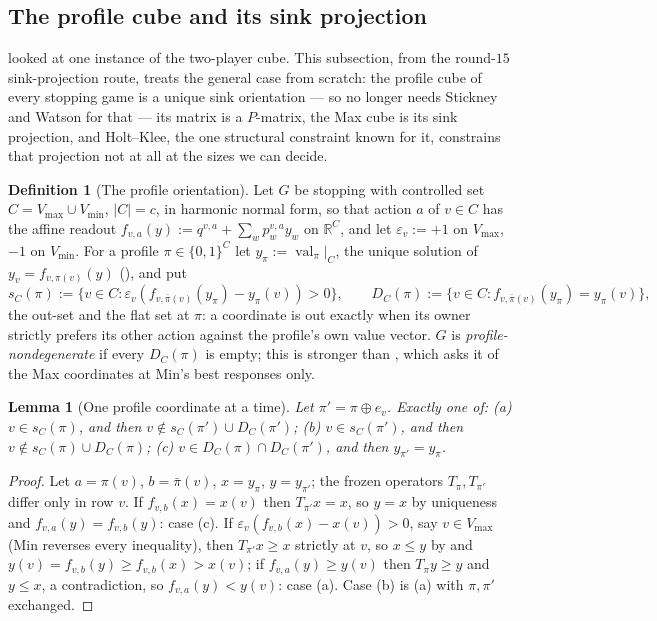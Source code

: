 \documentclass[11pt]{article}
\theoremstyle{plain}
\newtheorem{lemma}[theorem]{Lemma}
\theoremstyle{definition}
\newtheorem{definition}[theorem]{Definition}
\DeclareMathOperator{\val}{val}
\newcommand{\Vmax}{V_{\max}}
\newcommand{\Vmin}{V_{\min}}
\begin{document}
\subsection{The profile cube and its sink projection}\label{sec:projection}

 looked at one instance of the two-player cube.
This subsection, from the round-$15$ sink-projection route, treats the
general case from scratch: the profile cube of every stopping game is a
unique sink orientation --- so  no longer needs
Stickney and Watson for that --- its matrix is a $P$-matrix, the Max cube
is its sink projection, and Holt--Klee, the one structural constraint
known for it, constrains that projection not at all at the sizes we can
decide.

\begin{definition}[The profile orientation]\label{def:profile-orientation}
Let $G$ be stopping with controlled set $C=\Vmax\cup\Vmin$, $|C|=c$, in
harmonic normal form, so that action $a$ of $v\in C$ has the affine
readout $f_{v,a}(y):=q^{v,a}+\sum_wp^{v,a}_wy_w$ on $\mathbb R^{C}$, and
let $\varepsilon_v:=+1$ on $\Vmax$, $-1$ on $\Vmin$. For a profile
$\pi\in\{0,1\}^{C}$ let $y_\pi:=\val_\pi|_C$, the unique solution of
$y_v=f_{v,\pi(v)}(y)$ (), and put
\[
  s_C(\pi):=\{v\in C:\varepsilon_v(f_{v,\bar\pi(v)}(y_\pi)-y_\pi(v))>0\},\qquad
  D_C(\pi):=\{v\in C:f_{v,\bar\pi(v)}(y_\pi)=y_\pi(v)\},
\]
the out-set and the flat set at $\pi$: a coordinate is out exactly when
its owner strictly prefers its other action against the profile's own
value vector. $G$ is \emph{profile-nondegenerate} if every $D_C(\pi)$ is
empty; this is stronger than , which asks it of
the Max coordinates at Min's best responses only.
\end{definition}

\begin{lemma}[One profile coordinate at a time]\label{lem:profile-trichotomy}
Let $\pi'=\pi\oplus e_v$. Exactly one of: (a) $v\in s_C(\pi)$, and then
$v\notin s_C(\pi')\cup D_C(\pi')$; (b) $v\in s_C(\pi')$, and then
$v\notin s_C(\pi)\cup D_C(\pi)$; (c) $v\in D_C(\pi)\cap D_C(\pi')$, and
then $y_{\pi'}=y_\pi$.
\end{lemma}

\begin{proof}
Let $a=\pi(v)$, $b=\bar\pi(v)$, $x=y_\pi$, $y=y_{\pi'}$; the frozen
operators $T_\pi,T_{\pi'}$ differ only in row $v$. If
$f_{v,b}(x)=x(v)$ then $T_{\pi'}x=x$, so $y=x$ by uniqueness and
$f_{v,a}(y)=f_{v,b}(y)$: case (c). If $\varepsilon_v(f_{v,b}(x)-x(v))>0$,
say $v\in\Vmax$ (Min reverses every inequality), then $T_{\pi'}x\ge x$
strictly at $v$, so $x\le y$ by  and
$y(v)=f_{v,b}(y)\ge f_{v,b}(x)>x(v)$; if $f_{v,a}(y)\ge y(v)$ then
$T_\pi y\ge y$ and $y\le x$, a contradiction, so $f_{v,a}(y)<y(v)$:
case (a). Case (b) is (a) with $\pi,\pi'$ exchanged.
\end{proof}
\end{document}
